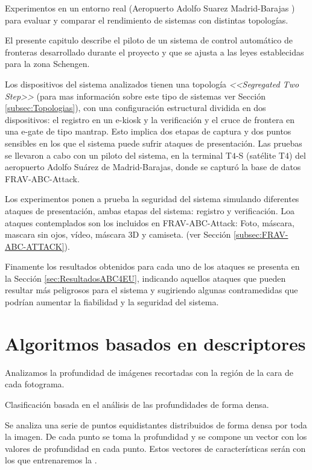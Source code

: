 Experimentos en un entorno real (Aeropuerto Adolfo Suarez Madrid-Barajas \cite{aeropuertoMadridBarajas}) para evaluar y comparar el rendimiento de sistemas  con distintas topologías. 

El presente capitulo describe el piloto de un sistema de control automático de fronteras  desarrollado durante el proyecto  y que se ajusta a las leyes establecidas para la zona \Gls{Schengen}.

Los dispositivos del sistema  analizados tienen una topología \textit{<<Segregated Two Step>>} (para mas información sobre este tipo de sistemas ver Sección \ref{subsec:Topologias}), con una configuración estructural dividida en dos dispositivos: el registro en un \gls{e-kiosk} y la verificación y el cruce de frontera en una \gls{e-gate} de tipo \gls{mantrap}. Esto implica dos etapas de captura y dos puntos sensibles en los que el sistema puede sufrir ataques de presentación. Las pruebas se llevaron a cabo con un piloto del sistema, en la terminal T$4$-S (satélite T$4$) del aeropuerto Adolfo Suárez de Madrid-Barajas, donde se capturó la base de datos \Gls{FRAV-ABC-Attack}.

Los experimentos ponen a prueba la seguridad del sistema simulando diferentes ataques de presentación, ambas etapas del sistema: registro y verificación. Loa ataques contemplados son los incluidos en \Gls{FRAV-ABC-Attack}: Foto, máscara, mascara sin ojos, vídeo, máscara $3$D y camiseta. (ver Sección \ref{subsec:FRAV-ABC-ATTACK}).

Finamente los resultados obtenidos para cada uno de los ataques se presenta en la Sección \ref{sec:ResultadosABC4EU}, indicando aquellos ataques que pueden resultar más peligrosos para el sistema y sugiriendo algunas contramedidas que podrían aumentar la fiabilidad y la seguridad del sistema.

\section{Algoritmos basados en descriptores}\label{sec:PAD_DESCRIPTORES}

Analizamos la profundidad de imágenes recortadas con la región de la cara de cada fotograma.

Clasificación basada en el análisis de las profundidades de forma densa.

Se analiza una serie de puntos equidistantes distribuidos de forma densa por toda la imagen. De cada punto se toma la profundidad y se compone un vector con los valores de profundidad en cada punto. Estos vectores de características serán con los que entrenaremos la .

